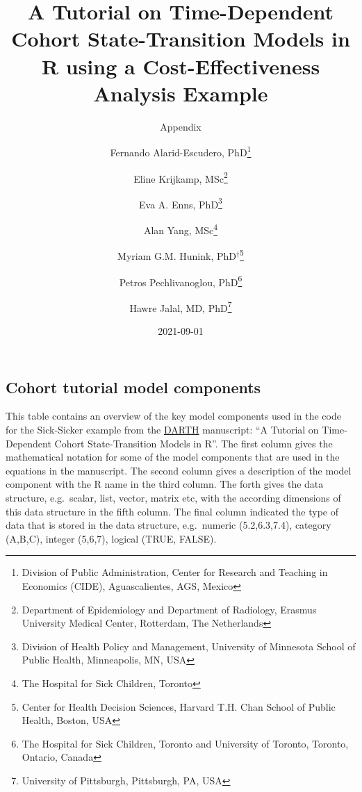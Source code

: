 \documentclass[
  landscape]{article}
\title{A Tutorial on Time-Dependent Cohort State-Transition Models in R
using a Cost-Effectiveness Analysis Example}
\subtitle{Appendix}
\author{Fernando Alarid-Escudero, PhD\footnote{Division of Public
  Administration, Center for Research and Teaching in Economics (CIDE),
  Aguascalientes, AGS, Mexico} \and Eline Krijkamp,
MSc\footnote{Department of Epidemiology and Department of Radiology,
  Erasmus University Medical Center, Rotterdam, The Netherlands} \and Eva
A. Enns, PhD\footnote{Division of Health Policy and Management,
  University of Minnesota School of Public Health, Minneapolis, MN, USA} \and Alan
Yang, MSc\footnote{The Hospital for Sick Children, Toronto} \and Myriam
G.M. Hunink, PhD\(^\dagger\)\footnote{Center for Health Decision
  Sciences, Harvard T.H. Chan School of Public Health, Boston, USA} \and Petros
Pechlivanoglou, PhD\footnote{The Hospital for Sick Children, Toronto and
  University of Toronto, Toronto, Ontario, Canada} \and Hawre Jalal, MD,
PhD\footnote{University of Pittsburgh, Pittsburgh, PA, USA}}
\date{2021-09-01}
\begin{document}
\maketitle

\hypertarget{cohort-tutorial-model-components}{%
\subsection{Cohort tutorial model
components}\label{cohort-tutorial-model-components}}

This table contains an overview of the key model components used in the
code for the Sick-Sicker example from the
\href{http://darthworkgroup.com/publications/}{DARTH} manuscript: ``A
Tutorial on Time-Dependent Cohort State-Transition Models in R''. The
first column gives the mathematical notation for some of the model
components that are used in the equations in the manuscript. The second
column gives a description of the model component with the R name in the
third column. The forth gives the data structure, e.g.~scalar, list,
vector, matrix etc, with the according dimensions of this data structure
in the fifth column. The final column indicated the type of data that is
stored in the data structure, e.g.~numeric (5.2,6.3,7.4), category
(A,B,C), integer (5,6,7), logical (TRUE, FALSE).
\end{document}
